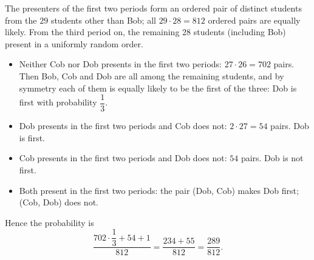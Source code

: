 The presenters of the first two periods form an ordered pair of distinct students from the $29$ students other than Bob; all $29\cdot28=812$ ordered pairs are equally likely. From the third period on, the remaining $28$ students (including Bob) present in a uniformly random order.
\begin{itemize}
\item Neither Cob nor Dob presents in the first two periods: $27\cdot26=702$ pairs. Then Bob, Cob and Dob are all among the remaining students, and by symmetry each of them is equally likely to be the first of the three: Dob is first with probability $\dfrac13$.
\item Dob presents in the first two periods and Cob does not: $2\cdot27=54$ pairs. Dob is first.
\item Cob presents in the first two periods and Dob does not: $54$ pairs. Dob is not first.
\item Both present in the first two periods: the pair (Dob, Cob) makes Dob first; (Cob, Dob) does not.
\end{itemize}
Hence the probability is
\[\dfrac{702\cdot\dfrac13+54+1}{812}=\dfrac{234+55}{812}=\boxed{\dfrac{289}{812}}.\]
